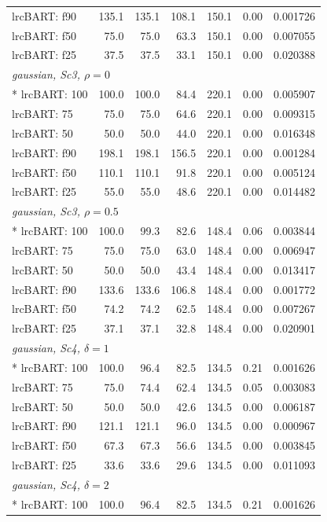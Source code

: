 \begin{longtable}{lrrrrrr}
lrcBART: f90 & 135.1 & 135.1 & 108.1 & 150.1 & 0.00 & 0.001726 \\
lrcBART: f50 & 75.0 & 75.0 & 63.3 & 150.1 & 0.00 & 0.007055 \\
lrcBART: f25 & 37.5 & 37.5 & 33.1 & 150.1 & 0.00 & 0.020388 \\
\multicolumn{7}{l}{\strut\textit{gaussian, Sc3, $\rho=0$}}\\*
lrcBART: 100 & 100.0 & 100.0 & 84.4 & 220.1 & 0.00 & 0.005907 \\
lrcBART: 75 & 75.0 & 75.0 & 64.6 & 220.1 & 0.00 & 0.009315 \\
lrcBART: 50 & 50.0 & 50.0 & 44.0 & 220.1 & 0.00 & 0.016348 \\
lrcBART: f90 & 198.1 & 198.1 & 156.5 & 220.1 & 0.00 & 0.001284 \\
lrcBART: f50 & 110.1 & 110.1 & 91.8 & 220.1 & 0.00 & 0.005124 \\
lrcBART: f25 & 55.0 & 55.0 & 48.6 & 220.1 & 0.00 & 0.014482 \\
\multicolumn{7}{l}{\strut\textit{gaussian, Sc3, $\rho=0.5$}}\\*
lrcBART: 100 & 100.0 & 99.3 & 82.6 & 148.4 & 0.06 & 0.003844 \\
lrcBART: 75 & 75.0 & 75.0 & 63.0 & 148.4 & 0.00 & 0.006947 \\
lrcBART: 50 & 50.0 & 50.0 & 43.4 & 148.4 & 0.00 & 0.013417 \\
lrcBART: f90 & 133.6 & 133.6 & 106.8 & 148.4 & 0.00 & 0.001772 \\
lrcBART: f50 & 74.2 & 74.2 & 62.5 & 148.4 & 0.00 & 0.007267 \\
lrcBART: f25 & 37.1 & 37.1 & 32.8 & 148.4 & 0.00 & 0.020901 \\
\multicolumn{7}{l}{\strut\textit{gaussian, Sc4, $\delta=1$}}\\*
lrcBART: 100 & 100.0 & 96.4 & 82.5 & 134.5 & 0.21 & 0.001626 \\
lrcBART: 75 & 75.0 & 74.4 & 62.4 & 134.5 & 0.05 & 0.003083 \\
lrcBART: 50 & 50.0 & 50.0 & 42.6 & 134.5 & 0.00 & 0.006187 \\
lrcBART: f90 & 121.1 & 121.1 & 96.0 & 134.5 & 0.00 & 0.000967 \\
lrcBART: f50 & 67.3 & 67.3 & 56.6 & 134.5 & 0.00 & 0.003845 \\
lrcBART: f25 & 33.6 & 33.6 & 29.6 & 134.5 & 0.00 & 0.011093 \\
\multicolumn{7}{l}{\strut\textit{gaussian, Sc4, $\delta=2$}}\\*
lrcBART: 100 & 100.0 & 96.4 & 82.5 & 134.5 & 0.21 & 0.001626 \\

\end{longtable}
